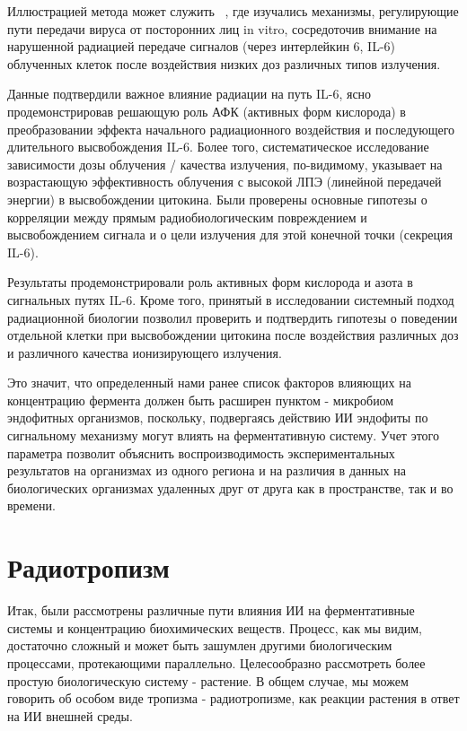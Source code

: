 \documentclass[11pt]{article}
\begin{document}
Иллюстрацией метода может служить ~\cite{Mariotti}, где изучались механизмы, регулирующие пути передачи вируса от посторонних лиц in vitro, сосредоточив внимание на нарушенной радиацией передаче сигналов (через интерлейкин 6, IL-6) облученных клеток после воздействия низких доз различных типов излучения.

Данные подтвердили важное влияние радиации на путь IL-6, ясно продемонстрировав решающую роль АФК (активных форм кислорода) в преобразовании эффекта начального радиационного воздействия и последующего длительного высвобождения IL-6. Более того, систематическое исследование зависимости дозы облучения / качества излучения, по-видимому, указывает на возрастающую эффективность облучения с высокой ЛПЭ (линейной передачей энергии) в высвобождении цитокина. Были проверены основные гипотезы о корреляции между прямым радиобиологическим повреждением и высвобождением сигнала и о цели излучения для этой конечной точки (секреция IL-6).

Результаты продемонстрировали роль активных форм кислорода и азота в сигнальных путях IL-6. Кроме того, принятый в исследовании системный подход радиационной биологии позволил  проверить и подтвердить гипотезы о поведении отдельной клетки при высвобождении цитокина после воздействия различных доз и различного качества ионизирующего излучения. 

Это значит, что определенный нами ранее список факторов влияющих на концентрацию фермента должен быть расширен пунктом - микробиом эндофитных организмов, поскольку, подвергаясь действию ИИ эндофиты по сигнальному механизму могут влиять на ферментативную систему. Учет этого параметра позволит объяснить воспроизводимость экспериментальных результатов на организмах из одного региона и на различия в данных на биологических организмах удаленных друг от друга как в пространстве, так и во времени.

\section{Радиотропизм}
Итак, были рассмотрены различные пути влияния ИИ на ферментативные системы и концентрацию биохимических веществ. Процесс, как мы видим, достаточно сложный и может быть зашумлен другими биологическим процессами, протекающими параллельно. 
Целесообразно рассмотреть более простую биологическую систему - растение.
В общем случае, мы можем говорить об особом виде тропизма - радиотропизме, как реакции растения в ответ на ИИ внешней среды.
\end{document}
